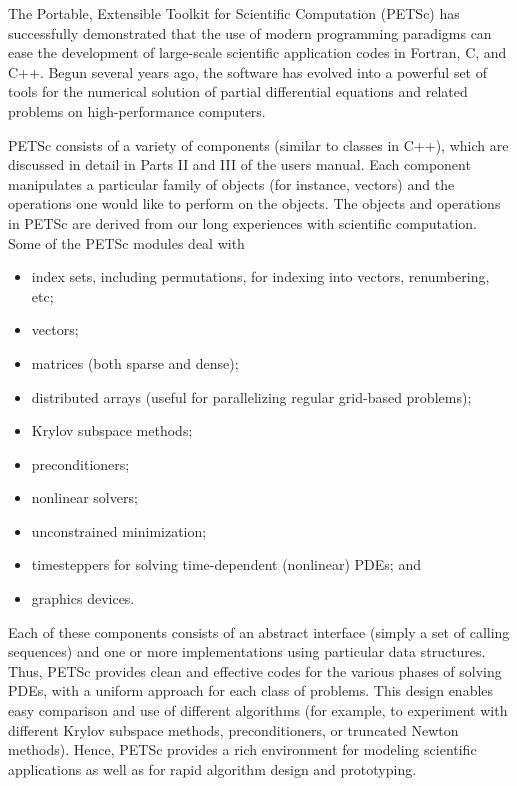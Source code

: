
%
%
%

\label{sec:gettingstarted}

The Portable, Extensible Toolkit for Scientific Computation (PETSc)
has successfully demonstrated that the use of modern programming
paradigms can ease the development of large-scale scientific
application codes in Fortran, C, and C++.  Begun several years ago,
the software has evolved into a powerful set of tools for the
numerical solution of partial differential equations and related problems 
on high-performance computers.

PETSc consists of a variety of components (similar to classes in C++),
which are discussed in detail in Parts II and III of the users manual.
Each component manipulates a particular family of objects (for instance,
vectors) and the operations one would like to perform on the objects.
The objects and operations in PETSc are derived from our long 
experiences with scientific computation. Some of the PETSc modules deal with 
\begin{itemize} 
\item index sets, including permutations, for indexing into vectors, renumbering, etc;
\item vectors;
\item matrices (both sparse and dense);
\item distributed arrays (useful for parallelizing regular grid-based 
      problems);
\item Krylov subspace methods;
\item preconditioners;
\item nonlinear solvers;
\item unconstrained minimization;
\item timesteppers for solving time-dependent (nonlinear) PDEs; and
\item graphics devices.
\end{itemize}
Each of these components consists of an abstract interface 
(simply a set of calling sequences) and one or more implementations 
using particular data structures. Thus, PETSc provides clean and 
effective codes for the various phases of solving PDEs, with a uniform 
approach for each class of problems.  This design
enables easy comparison and use of different algorithms (for example,
to experiment with different Krylov subspace methods, preconditioners,
or truncated Newton methods).
Hence, PETSc provides a rich environment for modeling scientific
applications as well as for rapid algorithm design and prototyping.

